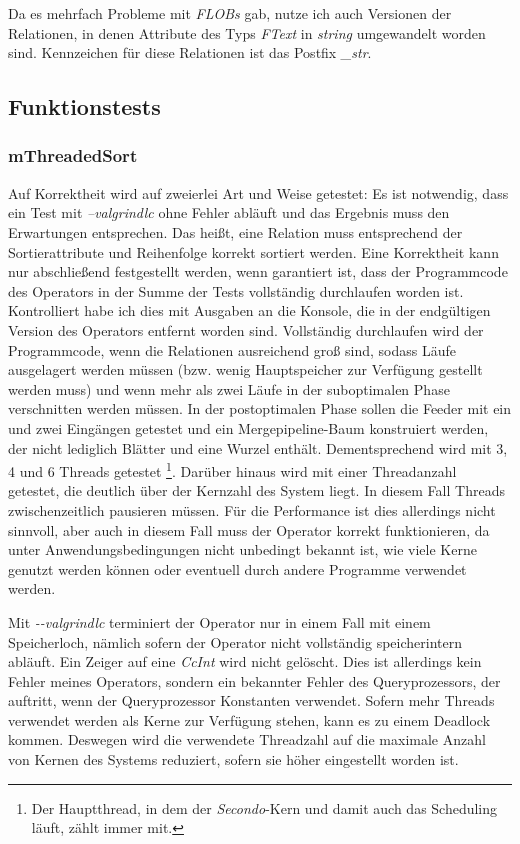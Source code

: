 \documentclass[a4paper,12pt,twoside]{article}
\newcommand{\Fb}[1]{\textit{#1}} %
\begin{document}
Da es mehrfach Probleme mit \Fb{FLOBs} gab, nutze ich auch Versionen der Relationen, in denen Attribute des Typs \Fb{FText} in \Fb{string} umgewandelt worden sind. Kennzeichen für diese Relationen ist das Postfix \Fb{\_str}.

\subsection{Funktionstests}

\subsubsection{mThreadedSort}

Auf Korrektheit wird auf zweierlei Art und Weise getestet: Es ist notwendig, dass ein Test mit \Fb{--valgrindlc} ohne Fehler abläuft und das Ergebnis muss den Erwartungen entsprechen. Das heißt, eine Relation muss entsprechend der Sortierattribute und Reihenfolge korrekt sortiert werden. Eine Korrektheit kann nur abschließend festgestellt werden, wenn garantiert ist, dass der Programmcode des Operators in der Summe der Tests vollständig durchlaufen worden ist. Kontrolliert habe ich dies mit Ausgaben an die Konsole, die in der endgültigen Version des Operators entfernt worden sind. Vollständig durchlaufen wird der Programmcode, wenn die Relationen ausreichend groß sind, sodass Läufe ausgelagert werden müssen (bzw. wenig Hauptspeicher zur Verfügung gestellt werden muss) und wenn mehr als zwei Läufe in der suboptimalen Phase verschnitten werden müssen. In der postoptimalen Phase sollen die Feeder mit ein und zwei Eingängen getestet und ein Mergepipeline-Baum konstruiert werden, der nicht lediglich Blätter und eine Wurzel enthält. Dementsprechend wird mit 3, 4 und 6 Threads getestet \footnote{Der Hauptthread, in dem der \Fb{Secondo}-Kern und damit auch das Scheduling läuft, zählt immer mit.}. Darüber hinaus wird mit einer Threadanzahl getestet, die deutlich über der Kernzahl des System liegt. In diesem Fall Threads zwischenzeitlich pausieren müssen. Für die Performance ist dies allerdings nicht sinnvoll, aber auch in diesem Fall muss der Operator korrekt funktionieren, da unter Anwendungsbedingungen nicht unbedingt bekannt ist, wie viele Kerne genutzt werden können oder eventuell durch andere Programme verwendet werden.

Mit \Fb{-{}-valgrindlc} terminiert der Operator nur in einem Fall mit einem Speicherloch, nämlich sofern der Operator nicht vollständig speicherintern abläuft. Ein Zeiger auf eine \Fb{CcInt} wird nicht gelöscht. Dies ist allerdings kein Fehler meines Operators, sondern ein bekannter Fehler des Queryprozessors, der auftritt, wenn der Queryprozessor Konstanten verwendet. Sofern mehr Threads verwendet werden als Kerne zur Verfügung stehen, kann es zu einem Deadlock kommen. Deswegen wird die verwendete Threadzahl auf die maximale Anzahl von Kernen des Systems reduziert, sofern sie höher eingestellt worden ist. 
\end{document}

